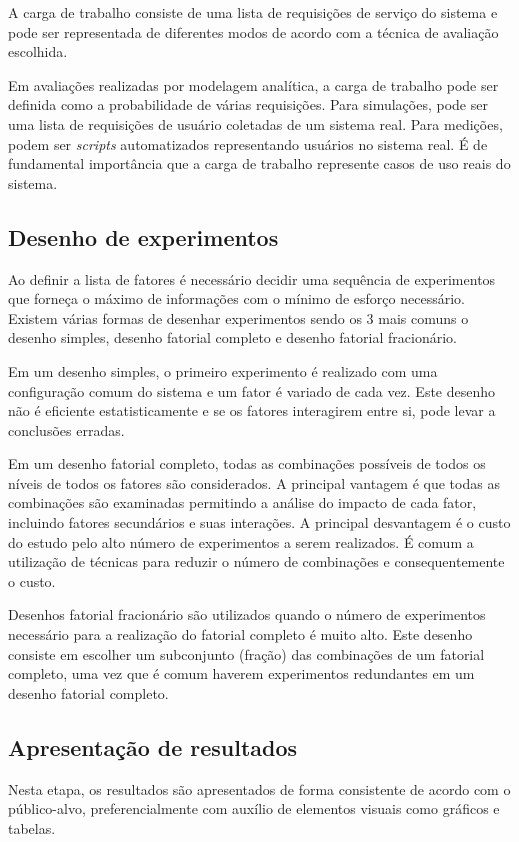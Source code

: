 A carga de trabalho consiste de uma lista de requisições de serviço do sistema e pode ser representada de diferentes modos de acordo com a técnica de avaliação escolhida.

Em avaliações realizadas por modelagem analítica, a carga de trabalho pode ser definida como a probabilidade de várias requisições. Para simulações, pode ser uma lista de requisições de usuário coletadas de um sistema real. Para medições, podem ser \textit{scripts} automatizados representando usuários no sistema real. É de fundamental importância que a carga de trabalho represente casos de uso reais do sistema.

\subsection{Desenho de experimentos}

Ao definir a lista de fatores é necessário decidir uma sequência de experimentos que forneça o máximo de informações com o mínimo de esforço necessário. Existem várias formas de desenhar experimentos sendo os 3 mais comuns o desenho simples, desenho fatorial completo e desenho fatorial fracionário.

Em um desenho simples, o primeiro experimento é realizado com uma configuração comum do sistema e um fator é variado de cada vez. Este desenho não é eficiente estatisticamente e se os fatores interagirem entre si, pode levar a conclusões erradas.

Em um desenho fatorial completo, todas as combinações possíveis de todos os níveis de todos os fatores são considerados. A principal vantagem é que todas as combinações são examinadas permitindo a análise do impacto de cada fator, incluindo fatores secundários e suas interações. A principal desvantagem é o custo do estudo pelo alto número de experimentos a serem realizados. É comum a utilização de técnicas para reduzir o número de combinações e consequentemente o custo.

Desenhos fatorial fracionário são utilizados quando o número de experimentos necessário para a realização do fatorial completo é muito alto. Este desenho consiste em escolher um subconjunto (fração) das combinações de um fatorial completo, uma vez que é comum haverem experimentos redundantes em um desenho fatorial completo.

\subsection{Apresentação de resultados}

Nesta etapa, os resultados são apresentados de forma consistente de acordo com o público-alvo, preferencialmente com auxílio de elementos visuais como gráficos e tabelas.
